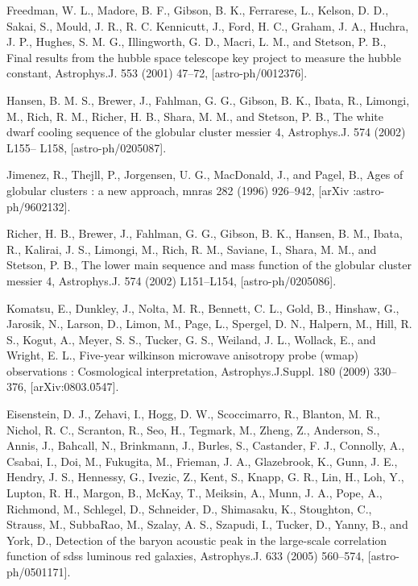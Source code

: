 \documentclass[a4paper,12pt]{report}
\theoremstyle{plain}
\theoremstyle{plain}
\begin{document}
\begin{thebibliography}{90}
 Freedman, W. L., Madore, B. F., Gibson, B. K., Ferrarese, L., Kelson, D. D., Sakai, S.,
Mould, J. R., R. C. Kennicutt, J., Ford, H. C., Graham, J. A., Huchra, J. P., Hughes,
S. M. G., Illingworth, G. D., Macri, L. M., and Stetson, P. B., Final results from the
hubble space telescope key project to measure the hubble constant, Astrophys.J. 553
(2001) 47–72, [astro-ph/0012376].

 Hansen, B. M. S., Brewer, J., Fahlman, G. G., Gibson, B. K., Ibata, R., Limongi,
M., Rich, R. M., Richer, H. B., Shara, M. M., and Stetson, P. B., The white dwarf
cooling sequence of the globular cluster messier 4, Astrophys.J. 574 (2002) L155–
L158, [astro-ph/0205087].

 Jimenez, R., Thejll, P., Jorgensen, U. G., MacDonald, J., and Pagel, B.,
Ages of globular clusters : a new approach, mnras 282 (1996) 926–942,
[arXiv :astro-ph/9602132].

 Richer, H. B., Brewer, J., Fahlman, G. G., Gibson, B. K., Hansen, B. M., Ibata,
R., Kalirai, J. S., Limongi, M., Rich, R. M., Saviane, I., Shara, M. M., and Stetson,
P. B., The lower main sequence and mass function of the globular cluster messier 4,
Astrophys.J. 574 (2002) L151–L154, [astro-ph/0205086].

 Komatsu, E., Dunkley, J., Nolta, M. R., Bennett, C. L., Gold, B., Hinshaw, G.,
Jarosik, N., Larson, D., Limon, M., Page, L., Spergel, D. N., Halpern, M., Hill, R. S.,
Kogut, A., Meyer, S. S., Tucker, G. S., Weiland, J. L., Wollack, E., and Wright, E. L.,
Five-year wilkinson microwave anisotropy probe (wmap) observations : Cosmological
interpretation, Astrophys.J.Suppl. 180 (2009) 330–376, [arXiv:0803.0547].

 Eisenstein, D. J., Zehavi, I., Hogg, D. W., Scoccimarro, R., Blanton, M. R., Nichol,
R. C., Scranton, R., Seo, H., Tegmark, M., Zheng, Z., Anderson, S., Annis, J., Bahcall,
N., Brinkmann, J., Burles, S., Castander, F. J., Connolly, A., Csabai, I., Doi, M.,
Fukugita, M., Frieman, J. A., Glazebrook, K., Gunn, J. E., Hendry, J. S., Hennessy,
G., Ivezic, Z., Kent, S., Knapp, G. R., Lin, H., Loh, Y., Lupton, R. H., Margon,
B., McKay, T., Meiksin, A., Munn, J. A., Pope, A., Richmond, M., Schlegel, D.,
Schneider, D., Shimasaku, K., Stoughton, C., Strauss, M., SubbaRao, M., Szalay,
A. S., Szapudi, I., Tucker, D., Yanny, B., and York, D., Detection of the baryon
acoustic peak in the large-scale correlation function of sdss luminous red galaxies,
Astrophys.J. 633 (2005) 560–574, [astro-ph/0501171].


\end{thebibliography}
\end{document}
